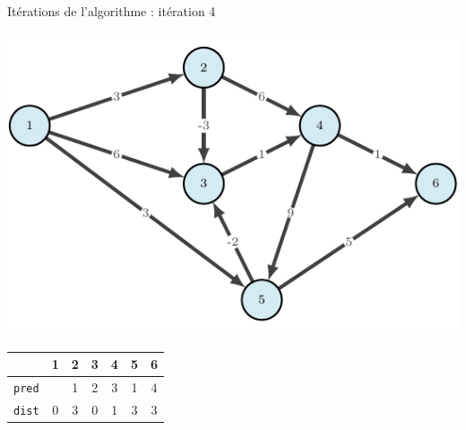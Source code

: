 \begin{frame}{Itérations de l'algorithme : itération 4}
    \begin{center}
        \includegraphics[height=.6\textheight]{fig/bellman-0.pdf}      
    \begin{tabular}{c|cccccc}
      
        & 1    &2      &3      &4      &5      &6      \\
        \hline
        \texttt{pred} & &1      &2      &3      &1      &4      \\
        \texttt{dist} & 0       &3      &0      &1      &3      &3      \\
                    \end{tabular}
\end{center}
\end{frame}


